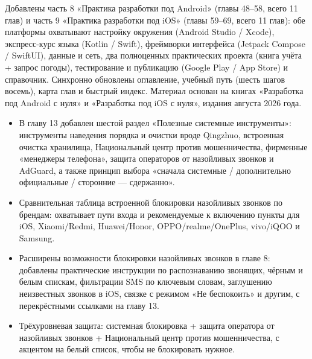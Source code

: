 Добавлены часть 8 «Практика разработки под Android» (главы 48–58, всего 11 глав) и часть 9 «Практика разработки под iOS» (главы 59–69, всего 11 глав): обе платформы охватывают настройку окружения (Android Studio / Xcode), экспресс-курс языка (Kotlin / Swift), фреймворки интерфейса (Jetpack Compose / SwiftUI), данные и сеть, два полноценных практических проекта (книга учёта + запрос погоды), тестирование и публикацию (Google Play / App Store) и справочник. Синхронно обновлены оглавление, учебный путь (шесть шагов восемь), карта глав и быстрый индекс. Материал основан на книгах «Разработка под Android с нуля» и «Разработка под iOS с нуля», издания августа 2026 года.


\begin{itemize}
  \item В главу 13 добавлен шестой раздел «Полезные системные инструменты»: инструменты наведения порядка и очистки вроде Qingzhuo, встроенная очистка хранилища, Национальный центр против мошенничества, фирменные «менеджеры телефона», защита операторов от назойливых звонков и AdGuard, а также принцип выбора «сначала системные / дополнительно официальные / сторонние — сдержанно».
  \item Сравнительная таблица встроенной блокировки назойливых звонков по брендам: охватывает пути входа и рекомендуемые к включению пункты для iOS, Xiaomi/Redmi, Huawei/Honor, OPPO/realme/OnePlus, vivo/iQOO и Samsung.
  \item Расширены возможности блокировки назойливых звонков в главе 8: добавлены практические инструкции по распознаванию звонящих, чёрным и белым спискам, фильтрации SMS по ключевым словам, заглушению неизвестных звонков в iOS, связке с режимом «Не беспокоить» и другим, с перекрёстными ссылками на главу 13.
  \item Трёхуровневая защита: системная блокировка + защита оператора от назойливых звонков + Национальный центр против мошенничества, с акцентом на белый список, чтобы не блокировать нужное.
\end{itemize}


